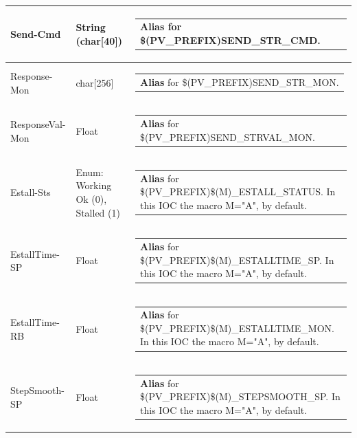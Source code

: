 \documentclass[openany]{article}
\begin{document}
\begin{longtable}{| m{4.5cm} m{2.5cm}  m{8.5cm} |}
        Send-Cmd & String (char[40]) & \begin{tabular}{@{}m{6cm}@{}}
                \textbf{\color{blue} Alias} for \$(PV\_PREFIX)SEND\_STR\_CMD.
            \end{tabular} \hypertarget{pv:response-mon}{}\\ \hline
        Response-Mon & char[256] & \begin{tabular}{@{}m{6cm}@{}}
                \textbf{\color{blue} Alias} for \$(PV\_PREFIX)SEND\_STR\_MON.
            \end{tabular} \hypertarget{pv:response-val-mon}{}\\ \hline
        ResponseVal-Mon & Float & \begin{tabular}{@{}m{6cm}@{}}
                \textbf{\color{blue} Alias} for \$(PV\_PREFIX)SEND\_STRVAL\_MON.
            \end{tabular} \hypertarget{pv:estall}{}\\ \hline
        Estall-Sts & Enum: Working Ok (0), Stalled (1) & \begin{tabular}{@{}m{6cm}@{}}
                \textbf{\color{blue} Alias} for \$(PV\_PREFIX)\$(M)\_ESTALL\_STATUS. In this IOC the macro M="A", by default.
            \end{tabular} \hypertarget{pv:estall-time}{}\\ \hline
        EstallTime-SP & Float & \begin{tabular}{@{}m{6cm}@{}}
                \textbf{\color{blue} Alias} for \$(PV\_PREFIX)\$(M)\_ESTALLTIME\_SP. In this IOC the macro M="A", by default.
            \end{tabular} \hypertarget{}{}\\ \hline
        EstallTime-RB & Float & \begin{tabular}{@{}m{6cm}@{}}
                \textbf{\color{blue} Alias} for \$(PV\_PREFIX)\$(M)\_ESTALLTIME\_MON. In this IOC the macro M="A", by default.
            \end{tabular} \hypertarget{pv:step-smooth}{}\\ \hline
        StepSmooth-SP & Float & \begin{tabular}{@{}m{6cm}@{}}
                \textbf{\color{blue} Alias} for \$(PV\_PREFIX)\$(M)\_STEPSMOOTH\_SP. In this IOC the macro M="A", by default.
            \end{tabular} \hypertarget{}{}\\ \hline

\end{longtable}
\end{document}
